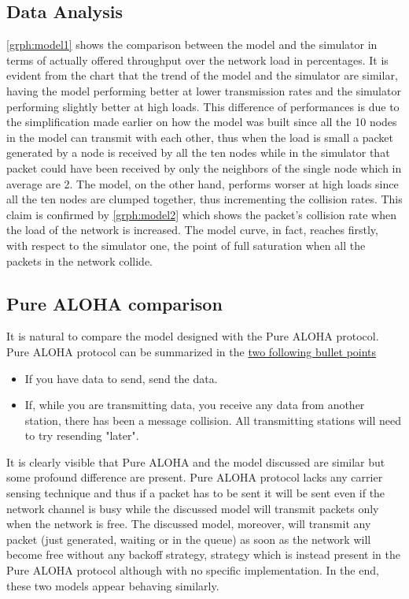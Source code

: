 \documentclass[conference]{IEEEtran}
\begin{document}
\subsection{Data Analysis}\label{sec:dataanalysismodel}
\cref{grph:model1} shows the comparison between the model and the simulator in terms of actually offered throughput over the network load in percentages. It is evident from the chart that the trend of the model and the simulator are similar, having the model performing better at lower transmission rates and the simulator performing slightly better at high loads. This difference of performances is due to the simplification made earlier on how the model was built since all the 10 nodes in the model can transmit with each other, thus when the load is small a packet generated by a node is received by all the ten nodes while in the simulator that packet could have been received by only the neighbors of the single node which in average are 2. The model, on the other hand, performs worser at high loads since all the ten nodes are clumped together, thus incrementing the collision rates. This claim is confirmed by \cref{grph:model2} which shows the packet's collision rate when the load of the network is increased. The model curve, in fact, reaches firstly, with respect to the simulator one, the point of full saturation when all the packets in the network collide. 

\subsection{Pure ALOHA comparison}\label{sec:purealohacomparison}
It is natural to compare the model designed with the Pure ALOHA protocol. Pure ALOHA protocol can be summarized in the \href{https://en.wikipedia.org/wiki/ALOHAnet#Pure_ALOHA}{two following bullet points}
\begin{itemize}
\item If you have data to send, send the data.
\item If, while you are transmitting data, you receive any data from another station, there has been a message collision. All transmitting stations will need to try resending "later".
\end{itemize}
It is clearly visible that Pure ALOHA and the model discussed are similar but some profound difference are present. Pure ALOHA protocol lacks any carrier sensing technique and thus if a packet has to be sent it will be sent even if the network channel is busy while the discussed model will transmit packets only when the network is free. The discussed model, moreover, will transmit any packet (just generated, waiting or in the queue) as soon as the network will become free without any backoff strategy, strategy which is instead present in the Pure ALOHA protocol although with no specific implementation. In the end, these two models appear behaving similarly.
\end{document}

